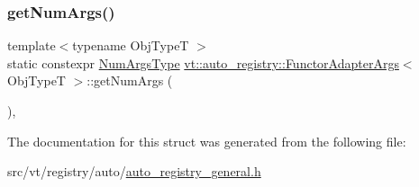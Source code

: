 \mbox{\label{structvt_1_1auto__registry_1_1_functor_adapter_args_3_01_obj_type_t_01_4_a500f114d1a088dddda86c016e80a561e}} 
\subsubsection{\texorpdfstring{get\+Num\+Args()}{getNumArgs()}}
{\footnotesize\ttfamily template$<$typename Obj\+TypeT $>$ \\
static constexpr \hyperlink{namespacevt_1_1auto__registry_aebda1d9d765bc9147dc654ad0712c936}{Num\+Args\+Type} \hyperlink{structvt_1_1auto__registry_1_1_functor_adapter_args}{vt\+::auto\+\_\+registry\+::\+Functor\+Adapter\+Args}$<$ Obj\+TypeT $>$\+::get\+Num\+Args (\begin{DoxyParamCaption}{ }\end{DoxyParamCaption})\hspace{0.3cm}{\ttfamily [inline]}, {\ttfamily [static]}}



The documentation for this struct was generated from the following file\+:\begin{DoxyCompactItemize}
\item 
src/vt/registry/auto/\hyperlink{auto__registry__general_8h}{auto\+\_\+registry\+\_\+general.\+h}\end{DoxyCompactItemize}
